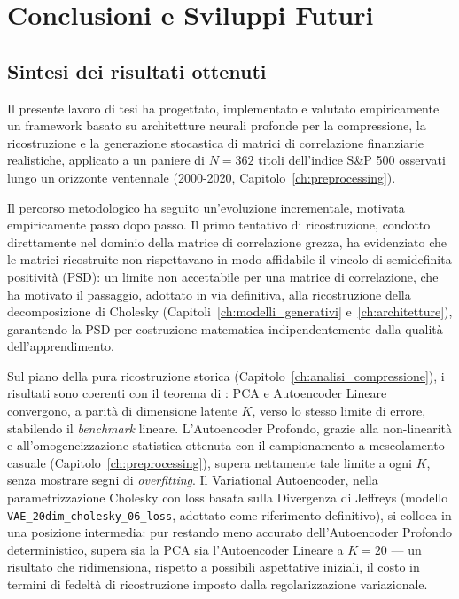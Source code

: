 \chapter{Conclusioni e Sviluppi Futuri}
\label{ch:conclusioni}

\section{Sintesi dei risultati ottenuti}
\label{sec:sintesi_risultati}

Il presente lavoro di tesi ha progettato, implementato e valutato empiricamente un framework basato su architetture neurali profonde per la compressione, la ricostruzione e la generazione stocastica di matrici di correlazione finanziarie realistiche, applicato a un paniere di $N=362$ titoli dell'indice S\&P 500 osservati lungo un orizzonte ventennale (2000-2020, Capitolo~\ref{ch:preprocessing}).

Il percorso metodologico ha seguito un'evoluzione incrementale, motivata empiricamente passo dopo passo. Il primo tentativo di ricostruzione, condotto direttamente nel dominio della matrice di correlazione grezza, ha evidenziato che le matrici ricostruite non rispettavano in modo affidabile il vincolo di semidefinita positività (PSD): un limite non accettabile per una matrice di correlazione, che ha motivato il passaggio, adottato in via definitiva, alla ricostruzione della decomposizione di Cholesky (Capitoli~\ref{ch:modelli_generativi} e~\ref{ch:architetture}), garantendo la PSD per costruzione matematica indipendentemente dalla qualità dell'apprendimento.

Sul piano della pura ricostruzione storica (Capitolo~\ref{ch:analisi_compressione}), i risultati sono coerenti con il teorema di \citet{bourlard1988autoassociation}: PCA e Autoencoder Lineare convergono, a parità di dimensione latente $K$, verso lo stesso limite di errore, stabilendo il \emph{benchmark} lineare. L'Autoencoder Profondo, grazie alla non-linearità e all'omogeneizzazione statistica ottenuta con il campionamento a mescolamento casuale (Capitolo~\ref{ch:preprocessing}), supera nettamente tale limite a ogni $K$, senza mostrare segni di \emph{overfitting}. Il Variational Autoencoder, nella parametrizzazione Cholesky con loss basata sulla Divergenza di Jeffreys (modello \texttt{VAE\_20dim\_cholesky\_06\_loss}, adottato come riferimento definitivo), si colloca in una posizione intermedia: pur restando meno accurato dell'Autoencoder Profondo deterministico, supera sia la PCA sia l'Autoencoder Lineare a $K=20$ --- un risultato che ridimensiona, rispetto a possibili aspettative iniziali, il costo in termini di fedeltà di ricostruzione imposto dalla regolarizzazione variazionale.

